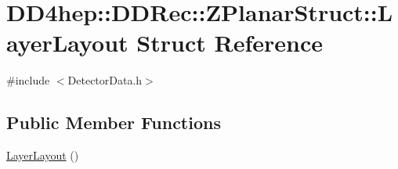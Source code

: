 \hypertarget{struct_d_d4hep_1_1_d_d_rec_1_1_z_planar_struct_1_1_layer_layout}{}\section{D\+D4hep\+:\+:D\+D\+Rec\+:\+:Z\+Planar\+Struct\+:\+:Layer\+Layout Struct Reference}
\label{struct_d_d4hep_1_1_d_d_rec_1_1_z_planar_struct_1_1_layer_layout}


{\ttfamily \#include $<$Detector\+Data.\+h$>$}

\subsection*{Public Member Functions}
\begin{DoxyCompactItemize}
\item 
\hyperlink{struct_d_d4hep_1_1_d_d_rec_1_1_z_planar_struct_1_1_layer_layout_ab128733c50738ce7dd0c00c44e16e57c}{Layer\+Layout} ()
\end{DoxyCompactItemize}
